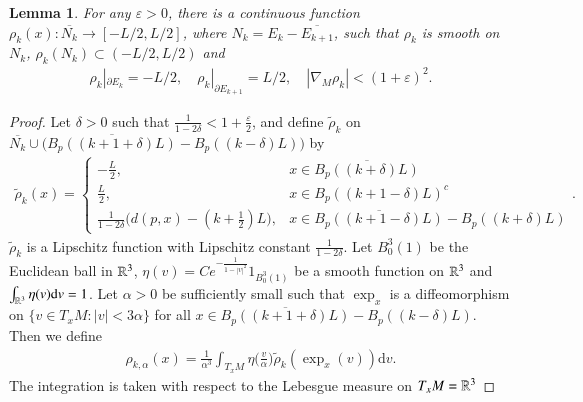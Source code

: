 \documentclass[11pt]{amsart}
\newtheorem{lemma}[theorem]{Lemma}
\numberwithin{equation}{section}
\def\R{{\bf\mathbb R} }
\renewcommand{\d}{\mathrm{d}}
\begin{document}
\begin{lemma}\label{lem existence of smooth function}
For any $\varepsilon>0$, there is a continuous function $\rho_k(x):\overline{N_k}\to [-L/2,L/2]$,  where $N_k= E_k- \overline{E_{k+ 1}}$, such that $\rho_k$ is smooth on $N_k$, $\rho_k(N_k)\subset(-L/2,L/2)$ and
\begin{align*}
    \rho_k|_{\partial E_k} = -L/2, \quad \rho_k|_{\partial E_{k+1}} = L/2, \quad |\nabla_M \rho_k|<(1+\varepsilon)^2.
\end{align*}
\end{lemma}

\begin{proof}
    Let $\delta>0$ such that $\frac{1}{1-2\delta}<1+\frac{\varepsilon}{2}$, and define $\tilde\rho_k$ on $\overline{N_k}\cup\Big(\overline{B_p((k+1+\delta)L)} - B_p((k-\delta)L)\Big)$ by
\begin{align*}
    \tilde\rho_k(x)=\left\{\begin{array}{ll}
     -\frac{L}{2}, & x\in \overline{B_p((k+\delta)L)}\\
     \frac{L}{2}, & x\in B_p((k+1-\delta)L)^c\\
     \frac{1}{1-2\delta}\big(d(p,x)-(k+\frac{1}{2}) L\big), & x\in \overline{B_p((k+1-\delta)L)}-B_p((k+\delta)L)
\end{array}\right..
\end{align*}
$\tilde\rho_k$ is a Lipschitz function with Lipschitz constant $\frac{1}{1-2\delta}$. Let $B_0^3(1)$ be the Euclidean ball in $\R^3$, $\eta(v)=Ce^{-\frac{1}{1-|v|^2}}1_{B_0^3(1)}$ be a smooth function on $\R^3$ and $\int_{\R^3}\eta(v)\d v=1$. Let $\alpha>0$ be sufficiently small such that $\exp_x$ is a diffeomorphism on $\{v\in T_x M:|v|<3\alpha\}$ for all $x\in \overline{B_p((k+1+\delta)L)}- B_p((k-\delta)L)$.
Then we define
\begin{align*}
    \rho_{k,\alpha}(x)=\frac{1}{\alpha^3}\int_{T_xM}\eta\Big(\frac{v}{\alpha}\Big)\tilde\rho_k(\exp_x (v))\d v.
\end{align*}
The integration is taken with respect to the Lebesgue measure on $T_xM=\R^3$


\end{proof}
\end{document}
